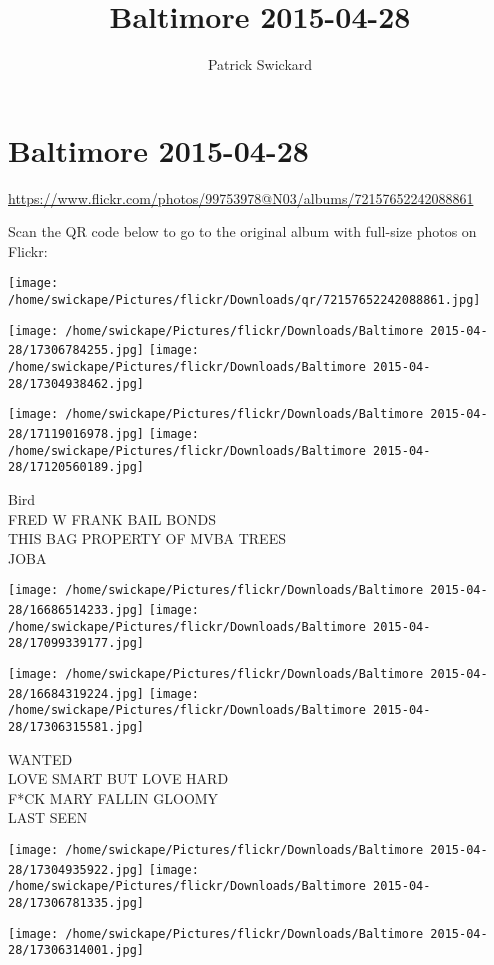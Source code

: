\documentclass[10pt,letterpaper]{article}
\title{Baltimore 2015-04-28}
\author{Patrick Swickard}
\date{}
\begin{document}
\section*{Baltimore 2015-04-28}

\url{https://www.flickr.com/photos/99753978@N03/albums/72157652242088861}

Scan the QR code below to go to the original album with full-size photos on Flickr:

\texttt{[image: /home/swickape/Pictures/flickr/Downloads/qr/72157652242088861.jpg]}
\pagebreak

\texttt{[image: /home/swickape/Pictures/flickr/Downloads/Baltimore 2015-04-28/17306784255.jpg]}
\texttt{[image: /home/swickape/Pictures/flickr/Downloads/Baltimore 2015-04-28/17304938462.jpg]}

\texttt{[image: /home/swickape/Pictures/flickr/Downloads/Baltimore 2015-04-28/17119016978.jpg]}
\texttt{[image: /home/swickape/Pictures/flickr/Downloads/Baltimore 2015-04-28/17120560189.jpg]}

Bird\\
FRED W FRANK BAIL BONDS\\
THIS BAG PROPERTY OF MVBA TREES\\
JOBA
\pagebreak

\texttt{[image: /home/swickape/Pictures/flickr/Downloads/Baltimore 2015-04-28/16686514233.jpg]}
\texttt{[image: /home/swickape/Pictures/flickr/Downloads/Baltimore 2015-04-28/17099339177.jpg]}

\texttt{[image: /home/swickape/Pictures/flickr/Downloads/Baltimore 2015-04-28/16684319224.jpg]}
\texttt{[image: /home/swickape/Pictures/flickr/Downloads/Baltimore 2015-04-28/17306315581.jpg]}

WANTED\\
LOVE SMART BUT LOVE HARD\\
F*CK MARY FALLIN GLOOMY\\
LAST SEEN
\pagebreak

\texttt{[image: /home/swickape/Pictures/flickr/Downloads/Baltimore 2015-04-28/17304935922.jpg]}
\texttt{[image: /home/swickape/Pictures/flickr/Downloads/Baltimore 2015-04-28/17306781335.jpg]}

\vspace{0.25in}
\texttt{[image: /home/swickape/Pictures/flickr/Downloads/Baltimore 2015-04-28/17306314001.jpg]}
\end{document}
